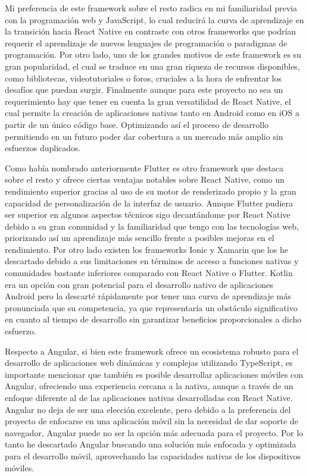 
Mi preferencia de este framework sobre el resto radica en mi familiaridad previa con la programación web y JavaScript, lo cual reducirá la curva de aprendizaje en la transición hacia React Native en contraste con otros frameworks que podrían requerir el aprendizaje de nuevos lenguajes de programación o paradigmas de programación. 
Por otro lado, uno de los grandes motivos de este framework es su gran popularidad, el cual se traduce en una gran riqueza de recursos disponibles, como bibliotecas, videotutoriales o foros, cruciales a la hora de enfrentar los desafíos que puedan surgir. 
Finalmente aunque para este proyecto no sea un requerimiento hay que tener en cuenta la gran versatilidad de React Native, el cual permite la creación de aplicaciones nativas tanto en Android como en iOS a partir de un único código base. Optimizando así el proceso de desarrollo permitiendo en un futuro poder dar cobertura a un mercado más amplio sin esfuerzos duplicados.

Como había nombrado anteriormente Flutter es otro framework que destaca sobre el resto y ofrece ciertas ventajas notables sobre React Native, como un rendimiento superior gracias al uso de su motor de renderizado propio y la gran capacidad de personalización de la interfaz de usuario. Aunque Flutter pudiera ser superior en algunos aspectos técnicos sigo decantándome por React Native debido a su gran comunidad y la familiaridad que tengo con las tecnologías web, priorizando así un aprendizaje más sencillo frente a posibles mejoras en el rendimiento. Por otro lado existen los frameworks Ionic y Xamarin que los he descartado debido a sus limitaciones en términos de acceso a funciones nativas y comunidades bastante inferiores comparado con React Native o Flutter. Kotlin era un opción con gran potencial para el desarrollo nativo de aplicaciones Android pero la descarté rápidamente por tener una curva de aprendizaje más pronunciada que su competencia, ya que representaría un obstáculo significativo en cuanto al tiempo de desarrollo sin garantizar beneficios proporcionales a dicho esfuerzo.

Respecto a Angular, si bien este framework ofrece un ecosistema robusto para el desarrollo de aplicaciones web dinámicas y complejas utilizando TypeScript, es importante mencionar que también es posible desarrollar aplicaciones móviles con Angular, ofreciendo una experiencia cercana a la nativa, aunque a través de un enfoque diferente al de las aplicaciones nativas desarrolladas con React Native. 
Angular no deja de ser una elección excelente, pero debido a la preferencia del proyecto de enfocarse en una aplicación móvil sin la necesidad de dar soporte de navegador, Angular puede no ser la opción más adecuada para el proyecto.
Por lo tanto he descartado Angular buscando una solución más enfocada y optimizada para el desarrollo móvil, aprovechando las capacidades nativas de los dispositivos móviles.


